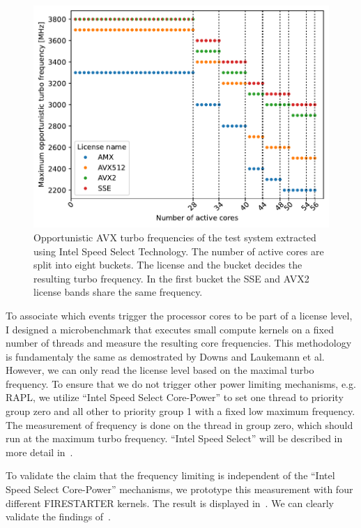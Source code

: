 \begin{figure}[]
    \centering
    \includegraphics[width=0.8\columnwidth]{fig/avx-frequency-license-bands.pdf}
    \caption{\label{fig:p0n-frequencies}Opportunistic AVX turbo frequencies of the test system extracted using Intel Speed Select Technology.
    The number of active cores are split into eight buckets. The license and the bucket decides the resulting turbo frequency.
    In the first bucket the SSE and AVX2 license bands share the same frequency.}
\end{figure}


To associate which events trigger the processor cores to be part of a license level, I designed a microbenchmark that executes small compute kernels on a fixed number of threads and measure the resulting core frequencies.
This methodology is fundamentaly the same as demostrated by Downs and Laukemann et al.
However, we can only read the license level based on the maximal turbo frequency.
To ensure that we do not trigger other power limiting mechanisms, e.g. RAPL, we utilize ``Intel Speed Select Core-Power'' to set one thread to priority group zero and all other to priority group 1 with a fixed low maximum frequency.
The measurement of frequency is done on the thread in group zero, which should run at the maximum turbo frequency.
``Intel Speed Select'' will be described in more detail in~.

To validate the claim that the frequency limiting is independent of the ``Intel Speed Select Core-Power'' mechanisms, we prototype this measurement with four different FIRESTARTER kernels.
The result is displayed in~.
We can clearly validate the findings of~.

